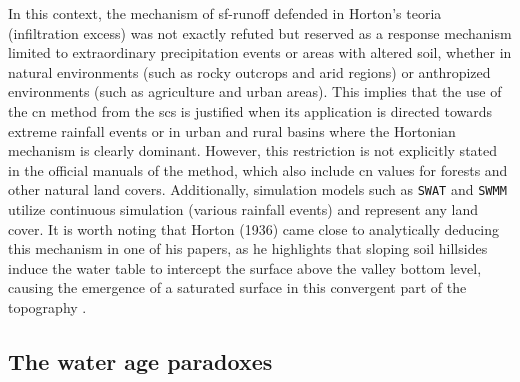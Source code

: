 \documentclass[./main_en.tex]{subfiles}
\begin{document}
\par In this context, the mechanism of \gls{sf-runoff} defended in Horton’s \gls{teoria} (infiltration excess) was not exactly refuted but reserved as a response mechanism limited to extraordinary precipitation events or areas with altered soil, whether in natural environments (such as rocky outcrops and arid regions) or anthropized environments (such as agriculture and urban areas). This implies that the use of the \acrshort{cn} method from the \acrshort{scs} is justified when its application is directed towards extreme rainfall events or in urban and rural basins where the Hortonian mechanism is clearly dominant. However, this restriction is not explicitly stated in the official manuals of the method, which also include \acrshort{cn} values for forests and other natural land covers. Additionally, simulation models such as \texttt{SWAT} and \texttt{SWMM} utilize continuous simulation (various rainfall events) and represent any land cover. It is worth noting that Horton (1936) \cite{Horton1936} came close to analytically deducing this mechanism in one of his papers, as he highlights that sloping soil hillsides induce the water table to intercept the surface above the valley bottom level, causing the emergence of a saturated surface in this convergent part of the topography \cite{Beven2004b}.

\subsection{The water age paradoxes}
\end{document}
